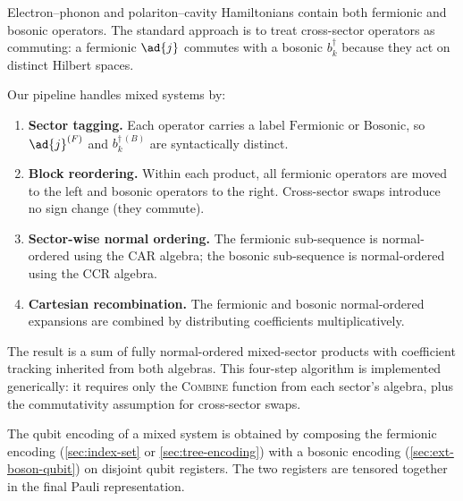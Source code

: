 Electron--phonon and polariton--cavity Hamiltonians contain both
fermionic and bosonic operators.  The standard approach is to treat
cross-sector operators as commuting: a fermionic $\ad{j}$ commutes
with a bosonic $b_k^\dagger$ because they act on distinct Hilbert
spaces.

Our pipeline handles mixed systems by:
\begin{enumerate}
  \item \textbf{Sector tagging.}  Each operator carries a label
    $\mathrm{Fermionic}$ or $\mathrm{Bosonic}$, so
    $\ad{j}^{(F)}$ and $b_k^{\dagger\,(B)}$ are syntactically
    distinct.
  \item \textbf{Block reordering.}  Within each product, all
    fermionic operators are moved to the left and bosonic operators
    to the right.  Cross-sector swaps introduce no sign change
    (they commute).
  \item \textbf{Sector-wise normal ordering.}  The fermionic
    sub-sequence is normal-ordered using the CAR algebra; the
    bosonic sub-sequence is normal-ordered using the CCR algebra.
  \item \textbf{Cartesian recombination.}  The fermionic and bosonic
    normal-ordered expansions are combined by distributing
    coefficients multiplicatively.
\end{enumerate}

The result is a sum of fully normal-ordered mixed-sector products
with coefficient tracking inherited from both algebras.  This
four-step algorithm is implemented generically: it requires only
the \textsc{Combine} function from each sector's algebra, plus the
commutativity assumption for cross-sector swaps.

\begin{remark}
The qubit encoding of a mixed system is obtained by composing the
fermionic encoding (\cref{sec:index-set} or \cref{sec:tree-encoding})
with a bosonic encoding (\cref{sec:ext-boson-qubit}) on disjoint
qubit registers.  The two registers are tensored together in the
final Pauli representation.
\end{remark}
